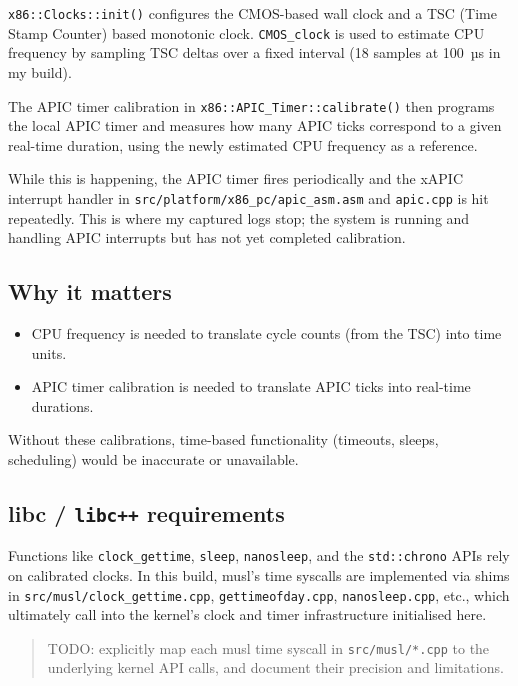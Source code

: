 \documentclass[a4paper,11pt]{article}
\begin{document}
\texttt{x86::Clocks::init()} configures the CMOS-based wall clock and a
TSC (Time Stamp Counter) based monotonic clock. \texttt{CMOS\_clock} is
used to estimate CPU frequency by sampling TSC deltas over a fixed
interval (18 samples at 100~µs in my build).

The APIC timer calibration in \texttt{x86::APIC\_Timer::calibrate()} then
programs the local APIC timer and measures how many APIC ticks correspond
to a given real-time duration, using the newly estimated CPU frequency
as a reference.

While this is happening, the APIC timer fires periodically and the
xAPIC interrupt handler in \texttt{src/platform/x86\_pc/apic\_asm.asm}
and \texttt{apic.cpp} is hit repeatedly. This is where my captured logs
stop; the system is running and handling APIC interrupts but has not yet
completed calibration.

\subsection{Why it matters}

\begin{itemize}
  \item CPU frequency is needed to translate cycle counts (from the TSC)
        into time units.
  \item APIC timer calibration is needed to translate APIC ticks into
        real-time durations.
\end{itemize}

Without these calibrations, time-based functionality (timeouts, sleeps,
scheduling) would be inaccurate or unavailable.

\subsection{libc / \texorpdfstring{\texttt{libc++}}{libc++} requirements}

Functions like \texttt{clock\_gettime}, \texttt{sleep},
\texttt{nanosleep}, and the \texttt{std::chrono} APIs rely on calibrated
clocks. In this build, musl’s time syscalls are implemented via shims in
\texttt{src/musl/clock\_gettime.cpp}, \texttt{gettimeofday.cpp},
\texttt{nanosleep.cpp}, etc., which ultimately call into the kernel’s
clock and timer infrastructure initialised here.

\begin{quote}
  TODO: explicitly map each musl time syscall in \texttt{src/musl/*.cpp}
  to the underlying kernel API calls, and document their precision and
  limitations.
\end{quote}
\end{document}
